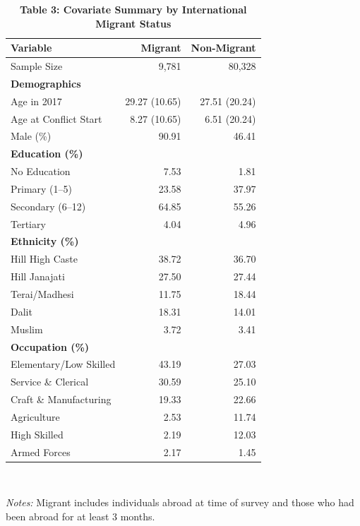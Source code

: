 \documentclass[12pt,letterpaper]{article}
\begin{document}
\begin{table}[H]
\centering
\caption*{\textbf{Table 3: Covariate Summary by International Migrant Status}}
\footnotesize
\begin{tabular}{@{}l r r@{}}
\toprule
Variable & Migrant & Non-Migrant \\
\midrule
Sample Size                 & 9,781  & 80,328 \\[3pt]
\multicolumn{3}{l}{\textbf{Demographics}} \\
\quad Age in 2017           & 29.27 (10.65) & 27.51 (20.24) \\
\quad Age at Conflict Start & 8.27 (10.65)  & 6.51 (20.24) \\
\quad Male (\%)             & 90.91         & 46.41 \\[3pt]
\multicolumn{3}{l}{\textbf{Education (\%)}} \\
\quad No Education          & 7.53  & 1.81 \\
\quad Primary (1--5)        & 23.58 & 37.97 \\
\quad Secondary (6--12)     & 64.85 & 55.26 \\
\quad Tertiary              & 4.04  & 4.96 \\[3pt]
\multicolumn{3}{l}{\textbf{Ethnicity (\%)}} \\
\quad Hill High Caste       & 38.72 & 36.70 \\
\quad Hill Janajati         & 27.50 & 27.44 \\
\quad Terai/Madhesi         & 11.75 & 18.44 \\
\quad Dalit                 & 18.31 & 14.01 \\
\quad Muslim                & 3.72  & 3.41 \\[3pt]
\multicolumn{3}{l}{\textbf{Occupation (\%)}} \\
\quad Elementary/Low Skilled & 43.19 & 27.03 \\
\quad Service \& Clerical   & 30.59 & 25.10 \\
\quad Craft \& Manufacturing & 19.33 & 22.66 \\
\quad Agriculture           & 2.53  & 11.74 \\
\quad High Skilled          & 2.19  & 12.03 \\
\quad Armed Forces          & 2.17  & 1.45 \\
\bottomrule
\end{tabular}
\\[4pt]
\begin{minipage}{0.85\textwidth}
\scriptsize
\textit{Notes:} Migrant includes individuals abroad at time of survey and those who had been abroad for at least 3 months.
\end{minipage}
\end{table}
\end{document}
